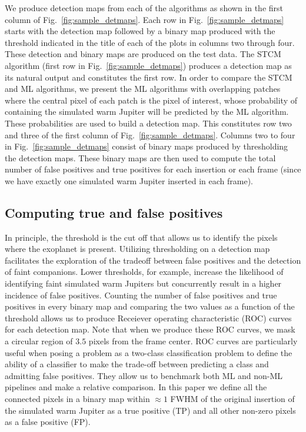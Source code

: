 \documentclass{aa}
\begin{document}
We produce detection maps from each of the algorithms as shown in the first column of Fig.~\ref{fig:sample_detmaps}.
Each row in Fig.~\ref{fig:sample_detmaps} starts with the detection map followed by a binary map produced with the threshold indicated in the title of each of the plots in columns two through four.
These detection and binary maps are produced on the test data.
The STCM algorithm (first row in Fig.~\ref{fig:sample_detmaps}) produces a detection map as its natural output and constitutes the first row.
In order to compare the STCM and ML algorithms, we present the ML algorithms with overlapping patches where the central pixel of each patch is the pixel of interest, whose probability of containing the simulated warm Jupiter will be predicted by the ML algorithm.
These probabilities are used to build a detection map.
This constitutes row two and three of the first column of Fig.~\ref{fig:sample_detmaps}.
Columns two to four in Fig.~\ref{fig:sample_detmaps} consist of binary maps produced by thresholding the detection maps.
These binary maps are then used to compute the total number of false positives and true positives for each insertion or each frame (since we have exactly one simulated warm Jupiter inserted in each frame).


\subsection{Computing true and false positives}
\label{sec:TPFP}

In principle, the threshold is the cut off that allows us to identify the pixels where the exoplanet is present.
Utilizing thresholding on a detection map facilitates the exploration of the tradeoff between false positives and the detection of faint companions. Lower thresholds, for example, increase the likelihood of identifying faint simulated warm Jupiters but concurrently result in a higher incidence of false positives.
Counting the number of false positives and true positives in every binary map and comparing the two values as a function of the threshold allows us to produce Receiever operating characteristic (ROC) curves for each detection map.
Note that when we produce these ROC curves, we mask a circular region of $3.5$ pixels from the frame center.
ROC curves are particularly useful when posing a problem as a two-class classification problem to define the ability of a classifier to make the trade-off between predicting a class and admitting false positives.
They allow us to benchmark both ML and non-ML pipelines and make a relative comparison. 
In this paper we define all the connected pixels in a binary map within $\approx 1$ FWHM of the original insertion of the simulated warm Jupiter as a true positive (TP) and all other non-zero pixels as a false positive (FP).
\end{document}
